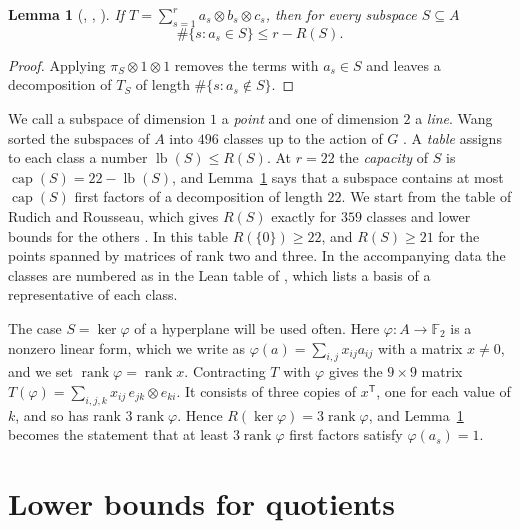 \documentclass[11pt]{amsart}
\newtheorem{lemma}[theorem]{Lemma}
\theoremstyle{definition}
\theoremstyle{remark}
\numberwithin{equation}{section}
\newcommand{\F}{\mathbb{F}_2}
\newcommand{\rk}{\operatorname{rank}}
\newcommand{\lb}{\operatorname{lb}}
\newcommand{\cp}{\operatorname{cap}}
\begin{document}
\begin{lemma}[{\cite[\S4]{DAm26}}, {\cite[Lemma~2.1]{Wan26b}}, {\cite[Lemma~2.2]{Yan26}}]\label{lem:cap}
If $T=\sum_{s=1}^{r}a_s\otimes b_s\otimes c_s$, then for every subspace $S\subseteq A$
\[
\#\{s : a_s\in S\}\le r-R(S).
\]
\end{lemma}

\begin{proof}
Applying $\pi_S\otimes 1\otimes 1$ removes the terms with $a_s\in S$ and leaves a decomposition of $T_S$ of length $\#\{s:a_s\notin S\}$.
\end{proof}

We call a subspace of dimension $1$ a \emph{point} and one of dimension $2$ a \emph{line}. Wang sorted the subspaces of $A$ into $496$ classes up to the action of $G$ \cite{Wan26a}. A \emph{table} assigns to each class a number $\lb(S)\le R(S)$. At $r=22$ the \emph{capacity} of $S$ is $\cp(S)=22-\lb(S)$, and Lemma~\ref{lem:cap} says that a subspace contains at most $\cp(S)$ first factors of a decomposition of length $22$. We start from the table of Rudich and Rousseau, which gives $R(S)$ exactly for $359$ classes and lower bounds for the others \cite{RR26}. In this table $R(\{0\})\ge 22$, and $R(S)\ge 21$ for the points spanned by matrices of rank two and three. In the accompanying data the classes are numbered as in the Lean table of \cite{RR26}, which lists a basis of a representative of each class.

The case $S=\ker\varphi$ of a hyperplane will be used often. Here $\varphi\colon A\to\F$ is a nonzero linear form, which we write as $\varphi(a)=\sum_{i,j}x_{ij}a_{ij}$ with a matrix $x\ne 0$, and we set $\rk\varphi=\rk x$. Contracting $T$ with $\varphi$ gives the $9\times 9$ matrix $T(\varphi)=\sum_{i,j,k}x_{ij}\, e_{jk}\otimes e_{ki}$. It consists of three copies of $x^{\mathsf T}$, one for each value of $k$, and so has rank $3\rk\varphi$. Hence $R(\ker\varphi)=3\rk\varphi$, and Lemma~\ref{lem:cap} becomes the statement that at least $3\rk\varphi$ first factors satisfy $\varphi(a_s)=1$.

\section{Lower bounds for quotients}\label{sec:raise}
\end{document}
